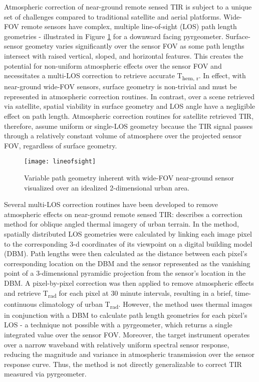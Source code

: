 \begin{bibunit}

Atmospheric correction of near-ground remote sensed TIR is subject to a unique set of challenges compared to traditional satellite and aerial platforms. Wide-FOV remote sensors have complex, multiple line-of-sight (LOS) path length geometries - illustrated in Figure \ref{lineofsight} for a downward facing pyrgeometer. Surface-sensor geometry varies significantly over the sensor FOV as some path lengths intersect with raised vertical, sloped, and horizontal features. This creates the potential for non-uniform atmospheric effects over the sensor FOV and necessitates a multi-LOS correction to retrieve accurate T\textsubscript{hem, r}. In effect, with near-ground wide-FOV sensors, surface geometry is non-trivial and must be represented in atmospheric correction routines. In contrast, over a scene retrieved via satellite, spatial viability in surface geometry and LOS angle have a negligible effect on path length. Atmospheric correction routines for satellite retrieved TIR, therefore, assume uniform or single-LOS geometry because the TIR signal passes through a relatively constant volume of atmosphere over the projected sensor FOV, regardless of surface geometry.

\begin{figure}[H]
	\texttt{[image: lineofsight]}
	\caption{Variable path geometry inherent with wide-FOV near-ground sensor visualized over an idealized 2-dimensional urban area.}
	\label{lineofsight}
\end{figure}

Several multi-LOS correction routines have been developed to remove atmospheric effects on near-ground remote sensed TIR: \citet{Meier2011} describes a correction method for oblique angled thermal imagery of urban terrain. In the method, spatially distributed LOS geometries were calculated by linking each image pixel to the corresponding 3-d coordinates of its viewpoint on a digital building model (DBM). Path lengths were then calculated as the distance between each pixel's corresponding location on the DBM and the sensor represented as the vanishing point of a 3-dimensional pyramidic projection from the sensor's location in the DBM. A pixel-by-pixel correction was then applied to remove atmospheric effects and retrieve T\textsubscript{rad} for each pixel at 30 minute intervals, resulting in a brief, time-continuous climatology of urban T\textsubscript{rad}. However, the method uses thermal images in conjunction with a DBM to calculate path length geometries for each pixel's LOS - a technique not possible with a pyrgeometer, which returns a single integrated value over the sensor FOV. Moreover, the target instrument operates over a narrow waveband with relatively uniform spectral sensor response, reducing the magnitude and variance in atmospheric transmission over the sensor response curve. Thus, the method is not directly generalizable to correct TIR measured via pyrgeometer.


\end{bibunit}
